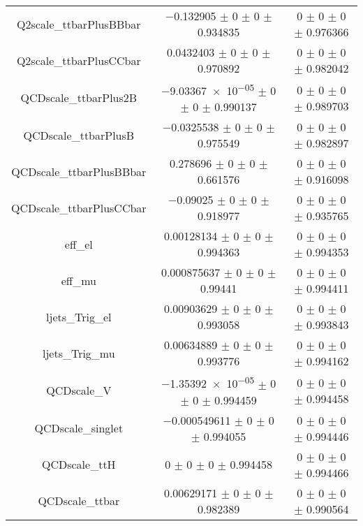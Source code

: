 \begin{table}
\begin{tabular}{ccc}
Q2scale\_ttbarPlusBBbar & \num{-0.132905} $\pm$ \num{0} $\pm$ \num{0} $\pm$ \num{0.934835} & \num{0} $\pm$ \num{0} $\pm$ \num{0} $\pm$ \num{0.976366}\\
Q2scale\_ttbarPlusCCbar & \num{0.0432403} $\pm$ \num{0} $\pm$ \num{0} $\pm$ \num{0.970892} & \num{0} $\pm$ \num{0} $\pm$ \num{0} $\pm$ \num{0.982042}\\
QCDscale\_ttbarPlus2B & \num{-9.03367e-05} $\pm$ \num{0} $\pm$ \num{0} $\pm$ \num{0.990137} & \num{0} $\pm$ \num{0} $\pm$ \num{0} $\pm$ \num{0.989703}\\
QCDscale\_ttbarPlusB & \num{-0.0325538} $\pm$ \num{0} $\pm$ \num{0} $\pm$ \num{0.975549} & \num{0} $\pm$ \num{0} $\pm$ \num{0} $\pm$ \num{0.982897}\\
QCDscale\_ttbarPlusBBbar & \num{0.278696} $\pm$ \num{0} $\pm$ \num{0} $\pm$ \num{0.661576} & \num{0} $\pm$ \num{0} $\pm$ \num{0} $\pm$ \num{0.916098}\\
QCDscale\_ttbarPlusCCbar & \num{-0.09025} $\pm$ \num{0} $\pm$ \num{0} $\pm$ \num{0.918977} & \num{0} $\pm$ \num{0} $\pm$ \num{0} $\pm$ \num{0.935765}\\
eff\_el & \num{0.00128134} $\pm$ \num{0} $\pm$ \num{0} $\pm$ \num{0.994363} & \num{0} $\pm$ \num{0} $\pm$ \num{0} $\pm$ \num{0.994353}\\
eff\_mu & \num{0.000875637} $\pm$ \num{0} $\pm$ \num{0} $\pm$ \num{0.99441} & \num{0} $\pm$ \num{0} $\pm$ \num{0} $\pm$ \num{0.994411}\\
ljets\_Trig\_el & \num{0.00903629} $\pm$ \num{0} $\pm$ \num{0} $\pm$ \num{0.993058} & \num{0} $\pm$ \num{0} $\pm$ \num{0} $\pm$ \num{0.993843}\\
ljets\_Trig\_mu & \num{0.00634889} $\pm$ \num{0} $\pm$ \num{0} $\pm$ \num{0.993776} & \num{0} $\pm$ \num{0} $\pm$ \num{0} $\pm$ \num{0.994162}\\
QCDscale\_V & \num{-1.35392e-05} $\pm$ \num{0} $\pm$ \num{0} $\pm$ \num{0.994459} & \num{0} $\pm$ \num{0} $\pm$ \num{0} $\pm$ \num{0.994458}\\
QCDscale\_singlet & \num{-0.000549611} $\pm$ \num{0} $\pm$ \num{0} $\pm$ \num{0.994055} & \num{0} $\pm$ \num{0} $\pm$ \num{0} $\pm$ \num{0.994446}\\
QCDscale\_ttH & \num{0} $\pm$ \num{0} $\pm$ \num{0} $\pm$ \num{0.994458} & \num{0} $\pm$ \num{0} $\pm$ \num{0} $\pm$ \num{0.994466}\\
QCDscale\_ttbar & \num{0.00629171} $\pm$ \num{0} $\pm$ \num{0} $\pm$ \num{0.982389} & \num{0} $\pm$ \num{0} $\pm$ \num{0} $\pm$ \num{0.990564}\\

\end{tabular}
\end{table}
